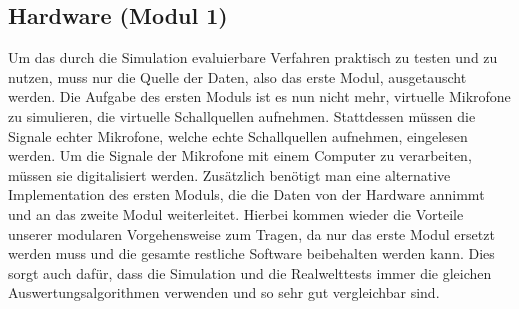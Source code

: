 \subsection{Hardware (Modul 1)}
Um das durch die Simulation evaluierbare Verfahren praktisch zu testen und zu nutzen, muss nur die Quelle der Daten, also das erste Modul, ausgetauscht werden. Die Aufgabe des ersten Moduls ist es nun nicht mehr, virtuelle Mikrofone  zu simulieren, die virtuelle Schallquellen aufnehmen. Stattdessen müssen die Signale echter Mikrofone, welche echte Schallquellen aufnehmen, eingelesen werden. Um die Signale der Mikrofone mit einem Computer zu verarbeiten, müssen sie digitalisiert werden. Zusätzlich benötigt man eine alternative Implementation des ersten Moduls, die die Daten von der Hardware annimmt und an das zweite Modul weiterleitet. Hierbei kommen wieder die Vorteile unserer modularen Vorgehensweise zum Tragen, da nur das erste Modul ersetzt werden muss und die gesamte restliche Software beibehalten werden kann. Dies sorgt auch dafür, dass die Simulation und die Realwelttests immer die gleichen Auswertungsalgorithmen verwenden und so sehr gut vergleichbar sind.
